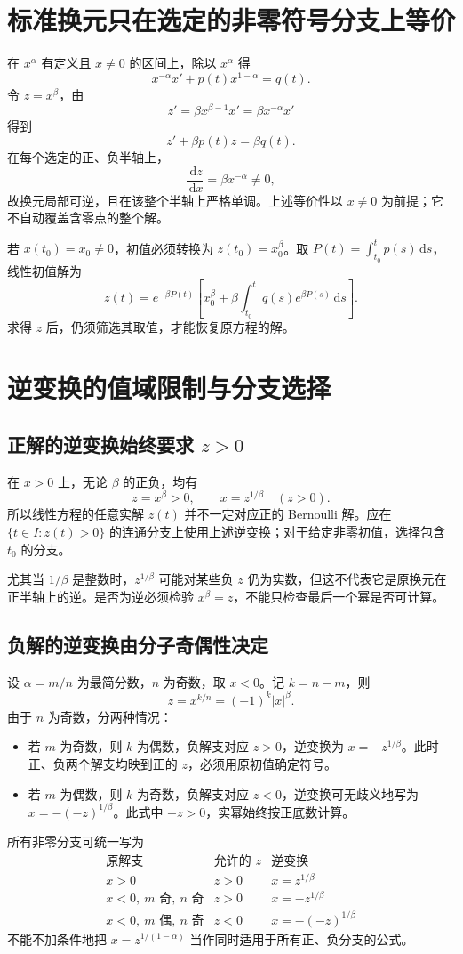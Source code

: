 \documentclass[11pt,a4paper]{ctexart}
\newcommand{\dd}{\,\mathrm d}
\begin{document}
\section{标准换元只在选定的非零符号分支上等价}
在 $x^\alpha$ 有定义且 $x\ne0$ 的区间上，除以 $x^\alpha$ 得
\[
x^{-\alpha}x'+p(t)x^{1-\alpha}=q(t).
\]
令 $z=x^\beta$，由
\[
z'=\beta x^{\beta-1}x'=\beta x^{-\alpha}x'
\]
得到
\[
\boxed{z'+\beta p(t)z=\beta q(t).}
\]
在每个选定的正、负半轴上，
\[
\frac{\dd z}{\dd x}=\beta x^{-\alpha}\ne0,
\]
故换元局部可逆，且在该整个半轴上严格单调。上述等价性以 $x\ne0$ 为前提；它不自动覆盖含零点的整个解。

若 $x(t_0)=x_0\ne0$，初值必须转换为 $z(t_0)=x_0^\beta$。取 $P(t)=\int_{t_0}^t p(s)\dd s$，线性初值解为
\[
\boxed{z(t)=e^{-\beta P(t)}
\left[x_0^\beta+\beta\int_{t_0}^t q(s)e^{\beta P(s)}\dd s\right].}
\]
求得 $z$ 后，仍须筛选其取值，才能恢复原方程的解。

\section{逆变换的值域限制与分支选择}
\subsection{正解的逆变换始终要求 $z>0$}
在 $x>0$ 上，无论 $\beta$ 的正负，均有
\[
z=x^\beta>0,\qquad \boxed{x=z^{1/\beta}\quad(z>0).}
\]
所以线性方程的任意实解 $z(t)$ 并不一定对应正的 Bernoulli 解。应在 $\{t\in I:z(t)>0\}$ 的连通分支上使用上述逆变换；对于给定非零初值，选择包含 $t_0$ 的分支。

尤其当 $1/\beta$ 是整数时，$z^{1/\beta}$ 可能对某些负 $z$ 仍为实数，但这不代表它是原换元在正半轴上的逆。是否为逆必须检验 $x^\beta=z$，不能只检查最后一个幂是否可计算。

\subsection{负解的逆变换由分子奇偶性决定}
设 $\alpha=m/n$ 为最简分数，$n$ 为奇数，取 $x<0$。记 $k=n-m$，则
\[
z=x^{k/n}=(-1)^k|x|^\beta.
\]
由于 $n$ 为奇数，分两种情况：
\begin{itemize}
\item 若 $m$ 为奇数，则 $k$ 为偶数，负解支对应 $z>0$，逆变换为 $x=-z^{1/\beta}$。此时正、负两个解支均映到正的 $z$，必须用原初值确定符号。
\item 若 $m$ 为偶数，则 $k$ 为奇数，负解支对应 $z<0$，逆变换可无歧义地写为 $x=-(-z)^{1/\beta}$。此式中 $-z>0$，实幂始终按正底数计算。
\end{itemize}
所有非零分支可统一写为
\[
\begin{array}{c|c|c}
\text{原解支}&\text{允许的 }z&\text{逆变换}\\\hline
x>0&z>0&x=z^{1/\beta}\\
x<0,\ m\text{ 奇},\ n\text{ 奇}&z>0&x=-z^{1/\beta}\\
x<0,\ m\text{ 偶},\ n\text{ 奇}&z<0&x=-(-z)^{1/\beta}
\end{array}
\]
不能不加条件地把 $x=z^{1/(1-\alpha)}$ 当作同时适用于所有正、负分支的公式。
\end{document}
